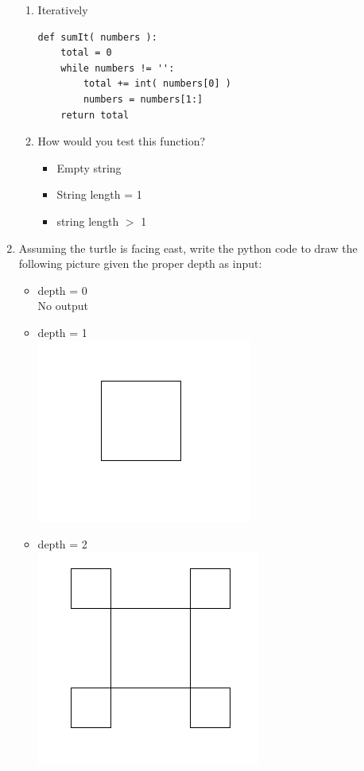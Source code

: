 \documentclass[11pt]{article}
\newenvironment{answer}{\large\lstset{basicstyle=\large}\color{white}}{}
\newenvironment{answer}{\large\lstset{basicstyle=\large}\color{red}}{}
\begin{document}
\begin{enumerate}
\begin{enumerate}
            \item Iteratively
\begin{answer}
\begin{lstlisting}
def sumIt( numbers ):
    total = 0
    while numbers != '':
        total += int( numbers[0] )
        numbers = numbers[1:]
    return total
\end{lstlisting}
\end{answer}
            \item How would you test this function?
                \begin{answer}
                \begin{itemize}
                    \item Empty string 
                    \item String length = 1
                    \item string length $>$ 1
                \end{itemize}
                \end{answer}
\pagebreak
\end{enumerate}
\item Assuming the turtle is facing east, write the python code to draw the following picture given the proper depth as input:
    \begin{itemize}
            \item depth = 0
           \\No output 
            \item depth = 1\\
            \includegraphics[scale=0.4]{1.png}
            \item depth = 2 \\
            \includegraphics[scale=0.4]{2.png}

\end{itemize}
\end{enumerate}
\end{document}
